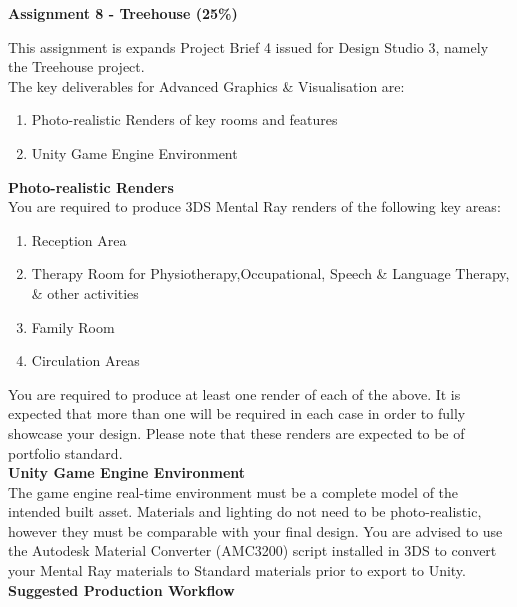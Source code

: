 
	
\begin{flushleft}
\Large\textbf{Assignment 8 - Treehouse (25\%)}\\
\end{flushleft}

This assignment is expands Project Brief 4 issued for Design Studio 3, namely the Treehouse project. \\

The key deliverables for Advanced Graphics \& Visualisation are:

\begin{enumerate}
	\item Photo-realistic Renders of key rooms and features
	\item Unity Game Engine Environment
\end{enumerate}

\textbf{Photo-realistic Renders}\\

You are required to produce 3DS Mental Ray renders of the following key areas:

\begin{enumerate}
	\item Reception Area
	\item Therapy Room for Physiotherapy,Occupational, Speech \& Language Therapy, \& other activities
	\item Family Room
	\item Circulation Areas
\end{enumerate}

You are required to produce at least one render of each of the above.  It is expected that more than one will be required in each case in order to fully showcase your design.  Please note that these renders are expected to be of portfolio standard.\\

\textbf{Unity Game Engine Environment}\\

The game engine real-time environment must be a complete model of the intended built asset.  Materials and lighting do not need to be photo-realistic, however they must be comparable with your final design.  You are advised to use the Autodesk Material Converter (AMC3200) script installed in 3DS to convert your Mental Ray materials to Standard materials prior to export to Unity.\\


\textbf{Suggested Production Workflow}\\

